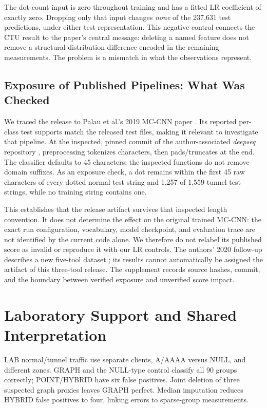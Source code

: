 \documentclass[conference]{IEEEtran}
\begin{document}
The dot-count input is zero throughout training and has a fitted LR coefficient of exactly zero. Dropping only that input changes \emph{none} of the 237,631 test predictions, under either test representation. This negative control connects the CTU result to the paper's central message: deleting a named feature does not remove a structural distribution difference encoded in the remaining measurements. The problem is a mismatch in what the observations represent.

\subsection{Exposure of Published Pipelines: What Was Checked}
We traced the release to Palau et al.'s 2019 MC-CNN paper \cite{ctupaper}. Its reported per-class test supports match the released test files, making it relevant to investigate that pipeline. At the inspected, pinned commit of the author-associated \emph{deepseq} repository \cite{deepseq}, preprocessing tokenizes characters, then pads/truncates at the end. The classifier defaults to 45 characters; the inspected functions do not remove domain suffixes. As an exposure check, a dot remains within the first 45 raw characters of every dotted normal test string and 1,257 of 1,559 tunnel test strings, while no training string contains one.

This establishes that the release artifact survives that inspected length convention. It does not determine the effect on the original trained MC-CNN: the exact run configuration, vocabulary, model checkpoint, and evaluation trace are not identified by the current code alone. We therefore do not relabel its published score as invalid or reproduce it with our LR controls. The authors' 2020 follow-up describes a new five-tool dataset \cite{palau2020}; its results cannot automatically be assigned the artifact of this three-tool release. The supplement records source hashes, commit, and the boundary between verified exposure and unverified score impact.

\section{Laboratory Support and Shared Interpretation}
LAB normal/tunnel traffic use separate clients, A/AAAA versus NULL, and different zones. GRAPH and the NULL-type control classify all 90 groups correctly; POINT/HYBRID have six false positives. Joint deletion of three suspected graph proxies leaves GRAPH perfect. Median imputation reduces HYBRID false positives to four, linking errors to sparse-group measurements.
\end{document}
